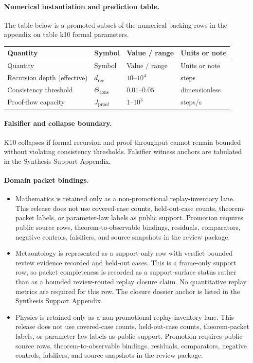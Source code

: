 \paragraph{Numerical instantiation and prediction table.}
The table below is a promoted subset of the numerical backing rows in the appendix on table k10 formal parameters.
\begin{longtable}{@{}L{0.27\textwidth}L{0.15\textwidth}L{0.24\textwidth}L{0.16\textwidth}@{}}
\toprule
Quantity & Symbol & Value / range & Units or note \\
\midrule
\endfirsthead
\toprule
Quantity & Symbol & Value / range & Units or note \\
\midrule
\endhead
Recursion depth (effective) & $\scriptstyle d_{\mathrm{rec}}$ & $10\text{--}10^4$ & steps \\
Consistency threshold & $\scriptstyle \Theta_{\mathrm{cons}}$ & $0.01\text{--}0.05$ & dimensionless \\
Proof-flow capacity & $\scriptstyle J_{\mathrm{proof}}$ & $1\text{--}10^3$ & steps/s \\
\bottomrule
\end{longtable}

\paragraph{Falsifier and collapse boundary.}
K10 collapses if formal recursion and proof throughput cannot remain bounded without violating consistency thresholds.
Falsifier witness anchors are tabulated in the Synthesis Support Appendix.

\paragraph{Domain packet bindings.}
\begin{itemize}[leftmargin=1.6em,nosep]
\item Mathematics is retained only as a non-promotional replay-inventory lane. This release does not use covered-case counts, held-out-case counts, theorem-packet labels, or parameter-law labels as public support. Promotion requires public source rows, theorem-to-observable bindings, residuals, comparators, negative controls, falsifiers, and source snapshots in the review package.
\item Metaontology is represented as a support-only row with verdict bounded review evidence recorded and  held-out cases. This is a frame-only support row, so packet completeness is recorded as a support-surface status rather than as a bounded review-routed replay closure claim. No quantitative replay metrics are required for this row. The closure dossier anchor is listed in the Synthesis Support Appendix.
\item Physics is retained only as a non-promotional replay-inventory lane. This release does not use covered-case counts, held-out-case counts, theorem-packet labels, or parameter-law labels as public support. Promotion requires public source rows, theorem-to-observable bindings, residuals, comparators, negative controls, falsifiers, and source snapshots in the review package.
\end{itemize}

